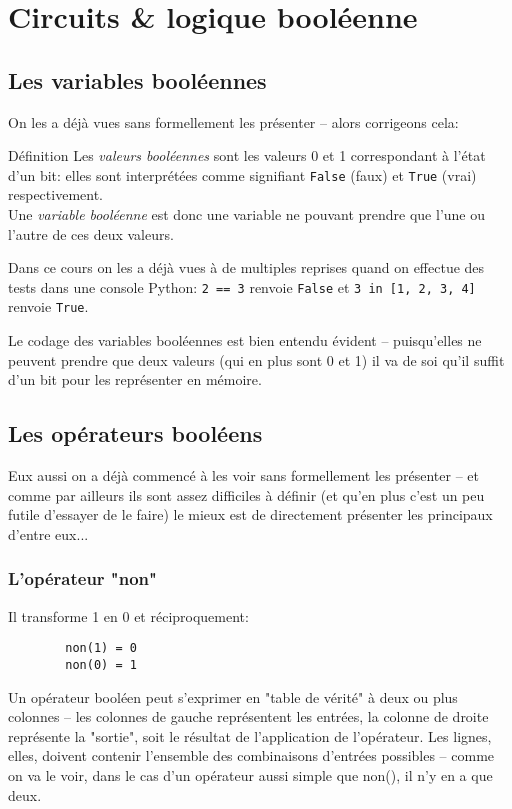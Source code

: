 \documentclass[12pt]{article}
\begin{document}
	
	\pagebreak
	\section{Circuits \& logique booléenne}
	\subsection{Les variables booléennes}
	On les a déjà vues sans formellement les présenter -- alors corrigeons cela:
	\begin{MonAmp}{Définition}
		Les \textit{valeurs booléennes} sont les valeurs 0 et 1 correspondant à l'état d’un bit: elles sont interprétées comme signifiant \texttt{False} (faux) et \texttt{True} (vrai) respectivement.
		\\
		
		Une \textit{variable booléenne} est donc une variable ne pouvant prendre que l’une ou l’autre de ces deux valeurs.
	\end{MonAmp}
	
	Dans ce cours on les a déjà vues à de multiples reprises quand on effectue des tests dans une console Python: \texttt{2 == 3} renvoie \texttt{False} et \texttt{3 in [1, 2, 3, 4]} renvoie \texttt{True}.
	
	Le codage des variables booléennes est bien entendu évident -- puisqu'elles ne peuvent prendre que deux valeurs (qui en plus sont 0 et 1) il va de soi qu'il suffit d'un bit pour les représenter en mémoire.
	
	\subsection{Les opérateurs booléens}
	Eux aussi on a déjà commencé à les voir sans formellement les présenter -- et comme par ailleurs ils sont assez difficiles à définir (et qu'en plus c'est un peu futile d'essayer de le faire) le mieux est de directement présenter les principaux d'entre eux...
	
	\subsubsection*{L'opérateur "non"}
	Il transforme 1 en 0 et réciproquement:
	
	\begin{verbatim}
		non(1) = 0
		non(0) = 1
	\end{verbatim}
	
	Un opérateur booléen peut s'exprimer en "table de vérité" à deux ou plus colonnes -- les colonnes de gauche représentent les entrées, la colonne de droite représente la "sortie", soit le résultat de l'application de l'opérateur. Les lignes, elles, doivent contenir l'ensemble des combinaisons d'entrées possibles -- comme on va le voir, dans le cas d'un opérateur aussi simple que non(), il n'y en a que deux.
	
\end{document}
